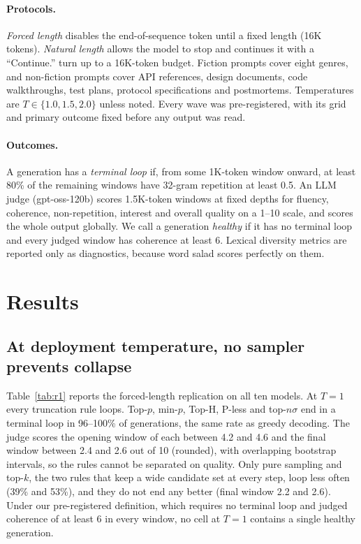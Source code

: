 \documentclass{article}
\newcommand{\pless}{P-less}
\begin{document}
\paragraph{Protocols.}
\emph{Forced length} disables the end-of-sequence token until a fixed length (16K tokens). \emph{Natural length} allows the model to stop and continues it with a ``Continue.'' turn up to a 16K-token budget. Fiction prompts cover eight genres, and non-fiction prompts cover API references, design documents, code walkthroughs, test plans, protocol specifications and postmortems. Temperatures are $T\in\{1.0,1.5,2.0\}$ unless noted. Every wave was pre-registered, with its grid and primary outcome fixed before any output was read.

\paragraph{Outcomes.}
A generation has a \emph{terminal loop} if, from some 1K-token window onward, at least 80\% of the remaining windows have 32-gram repetition at least 0.5. An LLM judge (gpt-oss-120b) scores 1.5K-token windows at fixed depths for fluency, coherence, non-repetition, interest and overall quality on a 1--10 scale, and scores the whole output globally. We call a generation \emph{healthy} if it has no terminal loop and every judged window has coherence at least 6. Lexical diversity metrics are reported only as diagnostics, because word salad scores perfectly on them.

\section{Results}
\label{sec:results}

\subsection{At deployment temperature, no sampler prevents collapse}
\label{sec:r1}

Table~\ref{tab:r1} reports the forced-length replication on all ten models. At $T{=}1$ every truncation rule loops. Top-$p$, min-$p$, Top-H, \pless{} and top-$n\sigma$ end in a terminal loop in 96--100\% of generations, the same rate as greedy decoding. The judge scores the opening window of each between 4.2 and 4.6 and the final window between 2.4 and 2.6 out of 10 (rounded), with overlapping bootstrap intervals, so the rules cannot be separated on quality. Only pure sampling and top-$k$, the two rules that keep a wide candidate set at every step, loop less often (39\% and 53\%), and they do not end any better (final window 2.2 and 2.6). Under our pre-registered definition, which requires no terminal loop and judged coherence of at least 6 in every window, no cell at $T{=}1$ contains a single healthy generation.
\end{document}
